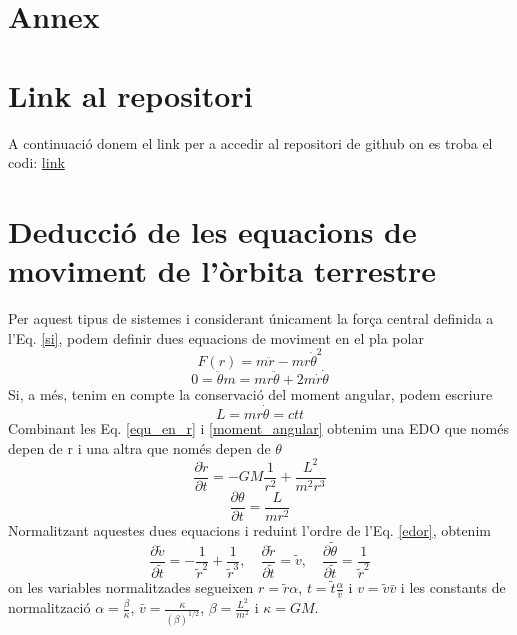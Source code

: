 \documentclass[11pt]{article}
\begin{document}
\section*{Annex}
\appendix

\section{Link al repositori}
\vspace{-1em}
A continuació donem el link per a accedir al repositori de github on es troba el codi: \href{https://github.com/isaacbg25/Sol/tree/main}{link}


\section{Deducció de les equacions de moviment de l'òrbita terrestre}
\label{annex: equ_mov}


Per aquest tipus de sistemes i considerant únicament la força central definida a l'Eq. \eqref{si}, podem definir dues equacions de moviment en el pla polar 
\begin{equation}
    F(r)=m\ddot{r}-mr{\dot{\theta}}^2
    \label{equ_en_r}
\end{equation}
\begin{equation}
    0=\ddot{\theta}m=mr\ddot{\theta}+2m\dot{r}\dot{\theta}
    \label{equ_en_theta}
\end{equation}
Si, a més, tenim en compte la conservació del moment angular, podem escriure
\begin{equation}
    L=mr\dot{\theta}=ctt
    \label{moment_angular}
\end{equation}
Combinant les Eq. \eqref{equ_en_r} i \eqref{moment_angular} obtenim una EDO que només depen de r i una altra que només depen de $\theta$
\begin{equation}
    \frac{\partial\dot{r}}{\partial t}=-GM\frac{1}{r^2}+\frac{L^2}{m^2r^3}
    \label{edor}
\end{equation}
\begin{equation}
    \frac{\partial\theta}{\partial t}=\frac{L}{mr^2}
    \label{edot}
\end{equation}
Normalitzant aquestes dues equacions i reduint l'ordre de l'Eq. \eqref{edor}, obtenim
\begin{equation}
    \frac{\partial\tilde{v}}{\partial\tilde{t}}=-\frac{1}{\tilde{r}^2}+\frac{1}{\tilde{r}^3}, \quad
    \frac{\partial\tilde{r}}{\partial\tilde{t}}=\tilde{v}, \quad
    \frac{\partial\tilde{\theta}}{\partial\tilde{t}}=\frac{1}{\tilde{r}^2}
    \label{eq:all}
\end{equation}
on les variables normalitzades segueixen $r=\tilde{r}\alpha$, $t=\tilde{t}\frac{\alpha}{\bar{v}}$ i $v=\tilde{v}\bar{v}$ i les constants de normalització $\alpha = \frac{\beta}{\kappa}$, $\bar{v}=\frac{\kappa}{(\beta)^{1/2}}$, $\beta=\frac{L^2}{m^2}$ i $\kappa=GM$.
\end{document}
